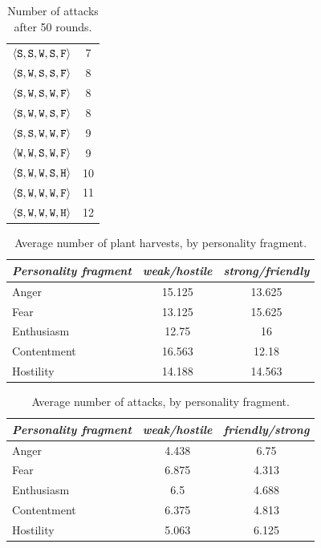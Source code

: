 \begin{table}
{{\begin{minipage}[b]{0.42\hsize}
\begin{tabular}{ l | c }
						$\langle \mathtt{S},\mathtt{S}, \mathtt{W}, \mathtt{S}, \mathtt{F} \rangle$ & 7\\
						$\langle \mathtt{S},\mathtt{W}, \mathtt{S}, \mathtt{S}, \mathtt{F} \rangle$ & 8\\
						$\langle \mathtt{S},\mathtt{W}, \mathtt{S}, \mathtt{W}, \mathtt{F} \rangle$ & 8\\
						$\langle \mathtt{S},\mathtt{W}, \mathtt{W}, \mathtt{S}, \mathtt{F} \rangle$ & 8\\
						$\langle \mathtt{S},\mathtt{S}, \mathtt{W}, \mathtt{W}, \mathtt{F} \rangle$ & 9\\
						$\langle \mathtt{W},\mathtt{W}, \mathtt{S}, \mathtt{W}, \mathtt{F} \rangle$ & 9\\
						$\langle \mathtt{S},\mathtt{W}, \mathtt{W}, \mathtt{S}, \mathtt{H} \rangle$ & 10\\
						$\langle \mathtt{S},\mathtt{W}, \mathtt{W}, \mathtt{W}, \mathtt{F} \rangle$ & 11\\
						$\langle \mathtt{S},\mathtt{W}, \mathtt{W}, \mathtt{W}, \mathtt{H} \rangle$ & 12\\
				\end{tabular}
				\caption{Number of attacks after 50 rounds.}
				\label{tab:numAttacks}
			\end{minipage}
			\hfill
		}}
\end{table}

\begin{table}
	\centering
	\begin{tabular}{ l | c | c }
		\emph{Personality fragment} & \emph{weak/hostile} & \emph{ strong/friendly} \\
		\hline
		Anger & 15.125 & 13.625\\
		Fear & 13.125 & 15.625 \\
		Enthusiasm & 12.75 & 16 \\
		Contentment & 16.563 & 12.18 \\
		Hostility & 14.188 & 14.563 \\
		\hline
	\end{tabular}
	\caption{Average number of plant harvests, by personality fragment.}
	\label{tab:numHarvestsAvg}
\end{table}

\begin{table}
	\centering
	\begin{tabular}{ l | c | c }
		\emph{Personality fragment} & \emph{weak/hostile} & \emph{friendly/strong} \\
		\hline
		Anger & 4.438 & 6.75 \\
		Fear & 6.875 & 4.313 \\
		Enthusiasm & 6.5 & 4.688 \\
		Contentment & 6.375 & 4.813 \\
		Hostility & 5.063 & 6.125 \\
		\hline
	\end{tabular}
	\caption{Average number of attacks, by personality fragment.}
	\label{tab:numAttacksAvg}
\end{table}


